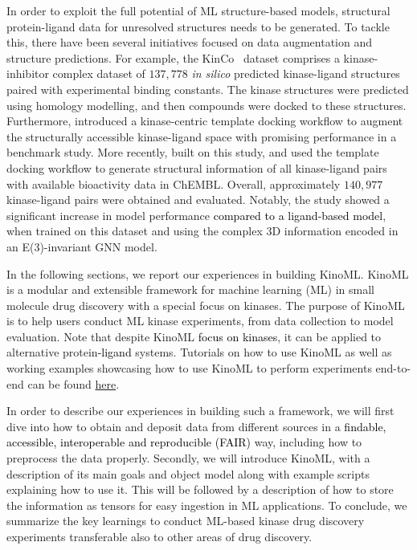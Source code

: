 \documentclass[9pt,lessons, pubversion]{livecoms}
\newcommand{\revision}[1]{\textcolor{black}{#1}}
\begin{document}
In order to exploit the full potential of ML structure-based models, structural protein-ligand data for unresolved structures needs to be generated. 
To tackle this, there have been several initiatives focused on data augmentation and structure predictions. 
For example, the KinCo~\cite{liu2023hybrid} dataset comprises a kinase-inhibitor complex dataset of $137,778$ \textit{in silico} predicted kinase-ligand structures paired with experimental binding constants. 
The kinase structures were predicted using homology modelling, and then compounds were docked to these structures. Furthermore, \citet{schaller2023benchmarking} introduced a kinase-centric template docking workflow to augment the structurally accessible kinase-ligand space with promising performance in a benchmark study. 
More recently, \citet{backenkohler2023guided} built on this study, and used the template docking workflow to generate structural information of all kinase-ligand pairs with available bioactivity data in ChEMBL.
Overall, approximately $140,977$ kinase-ligand pairs were obtained and evaluated.
Notably, the study showed a significant increase in model performance \revision{compared to a ligand-based model}, when trained on this dataset and using the complex 3D information encoded in an E(3)-invariant GNN model.

In the following sections, we report our experiences in building KinoML. KinoML is a modular and extensible framework for machine learning (ML) in small molecule drug discovery with a special focus on kinases. The purpose of KinoML is to help users conduct ML kinase experiments, from data collection to model evaluation. Note that despite KinoML \revision{focus on kinases}, it can be applied to alternative protein\revision{-ligand} systems. Tutorials on how to use KinoML as well as working examples showcasing how to use KinoML to perform experiments end-to-end can be found \href{https://github.com/openkinome/kinoml/tree/v1.0.0/tutorials}{here}. 


In order to describe our experiences in building such a framework, we will first dive into how to obtain and deposit data from different sources in a \revision{findable, accessible, interoperable and reproducible (FAIR)  \cite{wilkinson2016fair} } way, including how to preprocess the data properly. 
Secondly, we will introduce KinoML, with a description of its main goals and object model along with example scripts explaining how to use it. 
This will be followed by a description of how to store the information as tensors for easy ingestion in ML applications. 
To conclude, we summarize the key learnings to conduct ML-based kinase drug discovery experiments transferable also to other areas of drug discovery.
\end{document}
